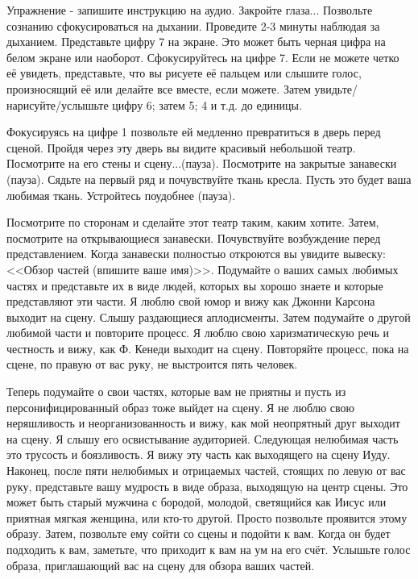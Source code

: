 \documentclass[10pt, fleqn]{article}
\begin{document}

Упражнение - запишите инструкцию на аудио.
Закройте глаза... Позвольте сознанию сфокусироваться на дыхании. Проведите 2-3 минуты наблюдая за дыханием. Представьте цифру 7 на экране. Это может быть черная цифра на белом экране или наоборот. Сфокусируйтесь на цифре 7. Если не можете четко её увидеть, представьте, что вы рисуете её пальцем или слышите голос, произносящий её или делайте все вместе, если можете. Затем увидьте/нарисуйте/услышьте цифру 6; затем 5; 4 и т.д. до единицы.


Фокусируясь на цифре 1 позвольте ей медленно превратиться в дверь перед сценой. Пройдя через эту дверь вы видите красивый небольшой театр. Посмотрите на его стены и сцену...(пауза). Посмотрите на закрытые занавески (пауза). Сядьте на первый ряд и почувствуйте ткань кресла. Пусть это будет ваша любимая ткань. Устройтесь поудобнее (пауза).

Посмотрите по сторонам и сделайте этот театр таким, каким хотите. Затем, посмотрите на открывающиеся занавески. Почувствуйте возбуждение перед представлением. Когда занавески полностью откроются вы увидите вывеску: <<Обзор частей (впишите ваше имя)>>. Подумайте о ваших самых любимых частях и представьте их в виде людей, которых вы хорошо знаете и которые представляют эти части. Я люблю свой юмор и вижу как Джонни Карсона выходит на сцену. Слышу раздающиеся аплодисменты. Затем подумайте о другой любимой части и повторите процесс. Я люблю свою харизматическую речь и честность и вижу, как Ф. Кенеди выходит на сцену. Повторяйте процесс, пока на сцене, по правую от вас руку, не выстроится пять человек.

Теперь подумайте о свои частях, которые вам не приятны и пусть из персонифицированный образ тоже выйдет на сцену. Я не люблю свою неряшливость и неорганизованность и вижу, как мой неопрятный друг выходит на сцену. Я слышу его освистывание аудиторией. Следующая нелюбимая часть это трусость и боязливость. Я вижу эту часть как выходящего на сцену Иуду. Наконец, после пяти нелюбимых и отрицаемых частей, стоящих по левую от вас руку, представьте вашу мудрость в виде образа, выходящую на центр сцены. Это может быть старый мужчина с бородой, молодой, светящийся как Иисус или приятная мягкая женщина, или кто-то другой. Просто позвольте проявится этому образу. Затем, позвольте ему сойти со сцены и подойти к вам. Когда он будет подходить к вам, заметьте, что приходит к вам на ум на его счёт. Услышьте голос образа, приглашающий вас на сцену для обзора ваших частей.
\end{document}
